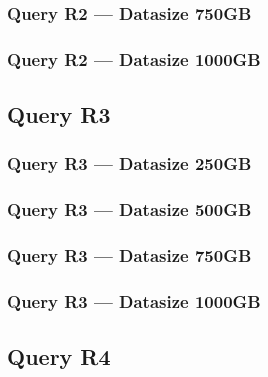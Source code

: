 \newpage
\subsubsection{Query R2 --- Datasize 750GB}



\newpage
\subsubsection{Query R2 --- Datasize 1000GB}



\newpage
\subsection{Query R3}
\subsubsection{Query R3 --- Datasize 250GB}



\newpage
\subsubsection{Query R3 --- Datasize 500GB}



\newpage
\subsubsection{Query R3 --- Datasize 750GB}



\newpage
\subsubsection{Query R3 --- Datasize 1000GB}



\newpage
\subsection{Query R4}

